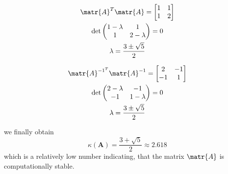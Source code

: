 \parbox{0.5\textwidth}{
\begin{gather*}
    \matr{A}^T\matr{A} =
    \begin{bmatrix}
        1 & 1 \\
        1 & 2
    \end{bmatrix} \\
    \det\begin{pmatrix}
        1-\lambda & 1 \\
        1 & 2-\lambda
    \end{pmatrix} = 0 \\
    \lambda=\frac{3\pm\sqrt{5}}{2}
    \end{gather*}
}
\parbox{0.5\textwidth}{
\begin{gather*}
     \matr{A}^{-1^T}\matr{A}^{-1} =
    \begin{bmatrix}
        2 & -1 \\
        -1 & 1
    \end{bmatrix} \\
    \det\begin{pmatrix}
        2-\lambda & -1 \\
        -1 & 1-\lambda
    \end{pmatrix} = 0 \\
    \lambda=\frac{3\pm\sqrt{5}}{2}
\end{gather*}
}
we finally obtain
\begin{equation*}
    \kappa(\mathbf{A})=\frac{3+\sqrt{5}}{2}\approx2.618
\end{equation*}
which is a relatively low number indicating, that the matrix $\matr{A}$ is computationally stable.
